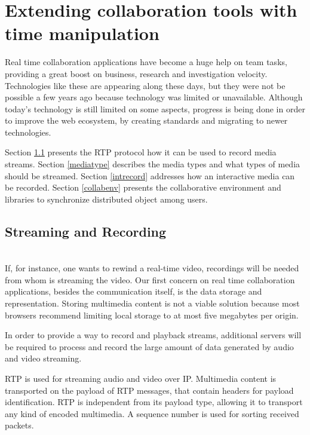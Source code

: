 \section{Extending collaboration tools with time manipulation}
\label{collab}

Real time collaboration applications have become a huge help on team tasks, providing a great boost on business, research and investigation velocity. Technologies like these are appearing along these days, but they were not be possible a few years ago because technology was limited or unavailable. Although today's technology is still limited on some aspects, progress is being done in order to improve the web ecosystem, by creating standards and migrating to newer technologies.

Section \ref{recstream} presents the RTP protocol how it can be used to record media streams. Section \ref{mediatype} describes the media types and what types of media should be streamed. Section \ref{intrecord} addresses how an interactive media can be recorded. Section \ref{collabenv} presents the collaborative environment and libraries to synchronize distributed object among users.

\subsection{Streaming and Recording}\label{recstream}~\\
	If, for instance, one wants to rewind a real-time video, recordings will be needed from whom is streaming the video. 
 Our first concern on real time collaboration applications, besides the communication itself, is the data storage and representation. Storing multimedia content is not a viable solution because most browsers recommend limiting local storage to at most five megabytes per origin.

 	In order to provide a way to record and playback streams, additional servers will be required to process and record the large amount of data generated by audio and video streaming.

 \ac{RTP}\cite{rfc3550} is used for streaming audio and video over \ac{IP}.
 Multimedia content is transported on the payload of \ac{RTP} messages, that contain headers for payload identification. \ac{RTP} is independent from its payload type, allowing it to transport any kind of encoded multimedia. A sequence number is used for sorting received packets.

